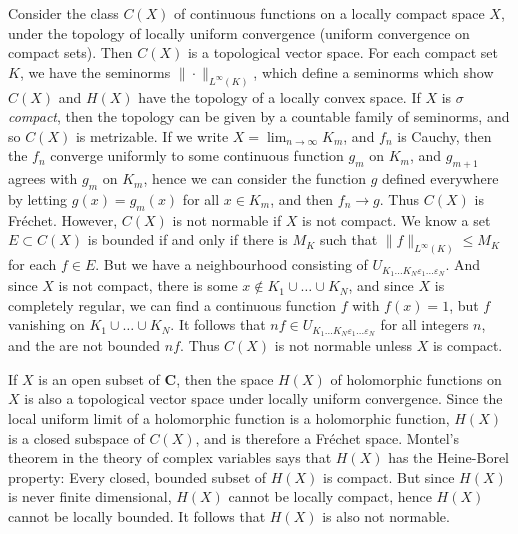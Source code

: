 \begin{example}
    Consider the class $C(X)$ of continuous functions on a locally compact space $X$, under the topology of locally uniform convergence (uniform convergence on compact sets). Then $C(X)$ is a topological vector space. For each compact set $K$, we have the seminorms $\| \cdot \|_{L^\infty(K)}$, which define a seminorms which show $C(X)$ and $H(X)$ have the topology of a locally convex space. If $X$ is {\it $\sigma$ compact}, then the topology can be given by a countable family of seminorms, and so $C(X)$ is metrizable. If we write $X = \lim_{n \to \infty} K_m$, and $f_n$ is Cauchy, then the $f_n$ converge uniformly to some continuous function $g_m$ on $K_m$, and $g_{m+1}$ agrees with $g_m$ on $K_m$, hence we can consider the function $g$ defined everywhere by letting $g(x) = g_m(x)$ for all $x \in K_m$, and then $f_n \to g$. Thus $C(X)$ is Fr\'{e}chet. However, $C(X)$ is not normable if $X$ is not compact. We know a set $E \subset C(X)$ is bounded if and only if there is $M_K$ such that $\| f \|_{L^\infty(K)} \leq M_K$ for each $f \in E$. But we have a neighbourhood consisting of $U_{K_1 \dots K_N \varepsilon_1 \dots \varepsilon_N}$. And since $X$ is not compact, there is some $x \not \in K_1 \cup \dots \cup K_N$, and since $X$ is completely regular, we can find a continuous function $f$ with $f(x) = 1$, but $f$ vanishing on $K_1 \cup \dots \cup K_N$. It follows that $nf \in U_{K_1 \dots K_N \varepsilon_1 \dots \varepsilon_N}$ for all integers $n$, and the are not bounded $nf$. Thus $C(X)$ is not normable unless $X$ is compact.
\end{example}

\begin{example}
    If $X$ is an open subset of $\mathbf{C}$, then the space $H(X)$ of holomorphic functions on $X$ is also a topological vector space under locally uniform convergence. Since the local uniform limit of a holomorphic function is a holomorphic function, $H(X)$ is a closed subspace of $C(X)$, and is therefore a Fr\'{e}chet space. Montel's theorem in the theory of complex variables says that $H(X)$ has the Heine-Borel property: Every closed, bounded subset of $H(X)$ is compact. But since $H(X)$ is never finite dimensional, $H(X)$ cannot be locally compact, hence $H(X)$ cannot be locally bounded. It follows that $H(X)$ is also not normable.
\end{example}

